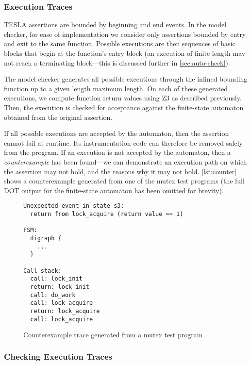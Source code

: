 \subsubsection{Execution Traces}

TESLA assertions are bounded by beginning and end events. In the model checker,
for ease of implementation we consider only assertions bounded by entry and exit
to the same function. Possible executions are then sequences of basic blocks
that begin at the function's entry block (an execution of finite length may not
reach a terminating block---this is discussed further in
\autoref{sec:auto-check}).

The model checker generates all possible executions through the inlined bounding
function up to a given length maximum length. On each of these generated
executions, we compute function return values using Z3 as described previously.
Then, the execution is checked for acceptance against the finite-state automaton
obtained from the original assertion.

If all possible executions are accepted by the automaton, then the assertion
cannot fail at runtime. Its instrumentation code can therefore be removed safely
from the program. If an execution is not accepted by the automaton, then a
\emph{counterexample} has been found---we can demonstrate an execution path on
which the assertion may not hold, and the reasons why it may not hold.
\autoref{lst:counter} shows a counterexample generated from one of the mutex
test programs (the full DOT output for the finite-state automaton has been
omitted for brevity).

\begin{figure}
  \begin{verbatim}
Unexpected event in state s3:
  return from lock_acquire (return value == 1)

FSM:
  digraph {
    ...
  }

Call stack:
  call: lock_init
  return: lock_init
  call: do_work
  call: lock_acquire
  return: lock_acquire
  call: lock_acquire
  \end{verbatim}
  \caption{Counterexample trace generated from a mutex test program}
  \label{lst:counter}
\end{figure}

\subsubsection{Checking Execution Traces} \label{sec:auto-check}

